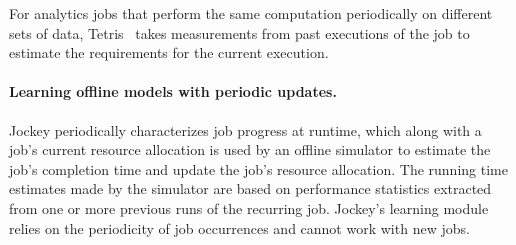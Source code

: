 
For analytics jobs that perform the same computation periodically on different sets
of data, Tetris~\cite{MultiResourcePackingForClusterSchedulers} takes
measurements from past executions of the job to estimate the requirements for
the current execution.




\paragraph{Learning offline models with periodic updates.}
Jockey \cite{jockey:eurosys2012} periodically characterizes job progress at
runtime, which along with a job's current resource allocation is used
{by an offline simulator to estimate the job's completion time
and update the job's resource allocation.}
\rm{The running time estimates made by the simulator are based
on performance statistics extracted from one or more previous runs of the
recurring job.} Jockey's learning module relies on the periodicity of job
occurrences and cannot work with new jobs.


